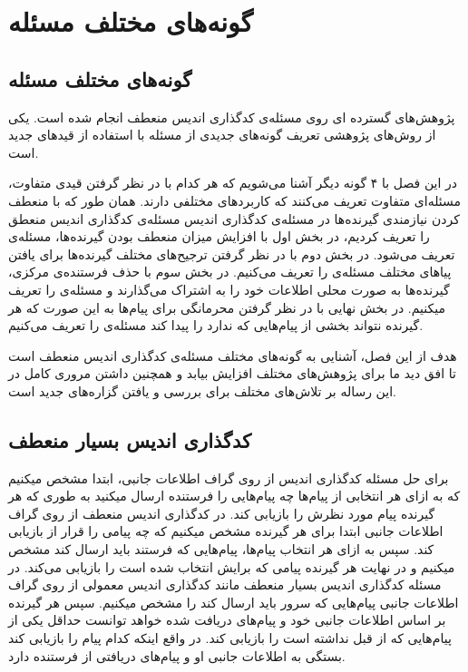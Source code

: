 
\chapter{
    گونه‌های مختلف مسئله
}
\section{
    گونه‌های مختلف مسئله
}
پژوهش‌های گسترده ای روی مسئله‌ی کدگذاری اندیس منعطف انجام شده است. یکی از روش‌های پژوهشی تعریف گونه‌های جدیدی از مسئله با استفاده از قیدهای جدید است.

در این فصل با ۴ گونه دیگر آشنا می‌شویم که هر کدام با در نظر گرفتن قیدی متفاوت، مسئله‌ای متفاوت تعریف می‌کنند که کاربردهای مختلفی دارند. همان طور که با منعطف کردن نیازمندی گیرنده‌ها در مسئله‌ی کدگذاری اندیس مسئله‌ی کدگذاری اندیس منعطق را تعریف کردیم، در بخش اول با افزایش میزان منعطف بودن گیرنده‌ها، مسئله‌ی 
 تعریف می‌شود. در بخش دوم با در نظر گرفتن ترجیح‌های مختلف گیرنده‌ها برای یافتن پیا‌های مختلف مسئله‌ی
 را تعریف می‌کنیم. در بخش سوم با حذف فرستنده‌ی مرکزی، گیرنده‌ها به صورت محلی اطلاعات خود را به اشتراک می‌گذارند و مسئله‌ی
 را تعریف میکنیم. در بخش نهایی با در نظر گرفتن محرمانگی برای پیام‌ها به این صورت که هر گیرنده نتواند بخشی از پیام‌هایی که ندارد را پیدا کند مسئله‌ی
 را تعریف می‌کنیم.
 
 هدف از این فصل، آشنایی به گونه‌های مختلف مسئله‌ی کدگذاری اندیس منعطف است تا افق دید ما برای پژوهش‌های مختلف افزایش بیابد و همچنین داشتن مروری کامل در این رساله بر تلاش‌های مختلف برای بررسی و یافتن گزاره‌های جدید است.

\section{کدگذاری اندیس بسیار منعطف}
برای حل مسئله کدگذاری اندیس از روی گراف اطلاعات جانبی، ابتدا مشخص میکنیم که به ازای هر انتخابی از پیام‌ها چه پیام‌هایی را فرستنده ارسال میکنید به طوری که هر گیرنده پیام مورد نظرش را بازیابی کند. در کدگذاری اندیس منعطف از روی گراف اطلاعات جانبی ابتدا برای هر گیرنده مشخص میکنیم که چه پیامی را قرار از بازیابی کند. سپس به ازای هر انتخاب پیام‌ها، پیام‌هایی که فرستند باید ارسال کند مشخص میکنیم و در نهایت هر گیرنده پیامی که برایش انتخاب شده است را بازیابی می‌کند. در مسئله کدگذاری اندیس بسیار منعطف مانند کدگذاری اندیس معمولی از روی گراف اطلاعات جانبی پیام‌هایی که سرور باید ارسال کند را مشخص میکنیم. سپس هر گیرنده بر اساس اطلاعات جانبی خود و پیام‌های دریافت شده خواهد توانست حداقل یکی از پیام‌هایی که از قبل نداشته است را بازیابی کند. در واقع اینکه کدام پیام را بازیابی کند بستگی به اطلاعات جانبی او و پیام‌های دریافتی از فرستنده دارد.

